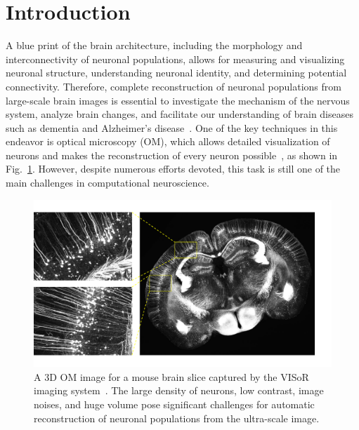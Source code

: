 \section{Introduction}
\label{sec:introduction}

A blue print of the brain architecture, including the morphology and interconnectivity of neuronal populations, allows for measuring and visualizing neuronal structure, understanding neuronal identity, and determining potential connectivity.
Therefore, complete reconstruction of neuronal populations from large-scale brain images is essential to investigate the mechanism of the nervous system, analyze brain changes, and facilitate our understanding of brain diseases such as dementia and Alzheimer's disease~\cite{Petrella2003, Giorgio2013}.
One of the key techniques in this endeavor is optical microscopy (OM), which allows detailed visualization of neurons and makes the reconstruction of every neuron possible~\cite{Senft2011}, as shown in Fig.~\ref{fig:brain}.
However, despite numerous efforts devoted, this task is still one of the main challenges in computational neuroscience.

\begin{figure}[t]
	\centering
	\includegraphics[width=1\columnwidth]{./Illustrations/brain2.pdf}
	\caption{A 3D OM image for a mouse brain slice captured by the VISoR imaging system~\cite{Wang2019}. The large density of neurons, low contrast, image noises, and huge volume pose significant challenges for automatic reconstruction of neuronal populations from the ultra-scale image.}	
	\label{fig:brain}
\end{figure}

